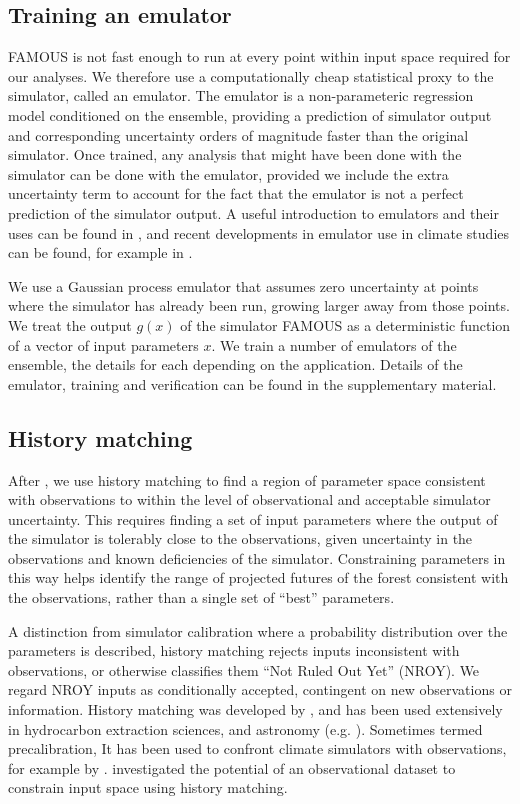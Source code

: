 \documentclass[esd, manuscript]{copernicus}
\begin{document}
\subsection{Training an emulator}\label{ssec:emulator}
FAMOUS is not fast enough to run at every point within input space required for our analyses. We therefore use a computationally cheap statistical proxy to the simulator, called an emulator. The emulator is a non-parameteric regression model conditioned on the ensemble, providing a prediction of simulator output and corresponding uncertainty orders of magnitude faster than the original simulator. Once trained, any analysis that might have been done with the simulator can be done with the emulator, provided we include the extra uncertainty term to account for the fact that the emulator is not a perfect prediction of the simulator output. A useful introduction to emulators and their uses can be found in \cite{o2006bayesian}, and recent developments in emulator use in climate studies can be found, for example in \cite{tran2016building,bounceur2015global}.

We use a Gaussian process emulator that assumes zero uncertainty at points where the simulator has already been run, growing larger away from those points. We treat the output $g(x)$ of the simulator FAMOUS as a deterministic function of a vector of input parameters $x$. We train a number of emulators of the ensemble, the details for each depending on the application. Details of the emulator, training and verification can be found in the supplementary material.

\subsection{History matching}\label{ssec:historymatching}
After \cite{williamson2014identifying}, we use history matching to find a region of parameter space consistent with observations to within the level of observational and acceptable simulator uncertainty. This requires finding a set of input parameters where the output of the simulator is tolerably close to the observations, given uncertainty in the observations and known deficiencies of the simulator. Constraining parameters in this way helps identify the range of projected futures of the forest consistent with the observations, rather than a single set of ``best'' parameters.

A distinction from simulator calibration where a probability distribution over the parameters is described, history matching rejects inputs inconsistent with observations, or otherwise classifies them ``Not Ruled Out Yet'' (NROY). We regard NROY inputs as conditionally accepted, contingent on new observations or information. History matching was developed by \cite{craig1997pressure}, and has been used extensively in hydrocarbon extraction sciences, and astronomy (e.g. \cite{vernon2010galaxy}). Sometimes termed precalibration, It has been used to confront climate simulators with observations, for example by \cite{lee2016aerosol, williamson2013history, holden2009precalibration}. \cite{mcneall2013potential} investigated the potential of an observational dataset to constrain input space using history matching.
\end{document}
